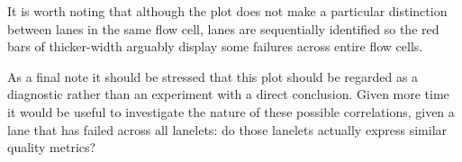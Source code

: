 It is worth noting that although the plot does not make a particular
distinction between lanes in the same flow cell, lanes are sequentially
identified so the red bars of thicker-width arguably display some failures
across entire flow cells.

As a final note it should be stressed that this plot should be regarded as a
diagnostic rather than an experiment with a direct conclusion. Given more time it
would be useful to investigate the nature of these possible correlations, given
a lane that has failed across all lanelets: do those lanelets actually express
similar quality metrics?

